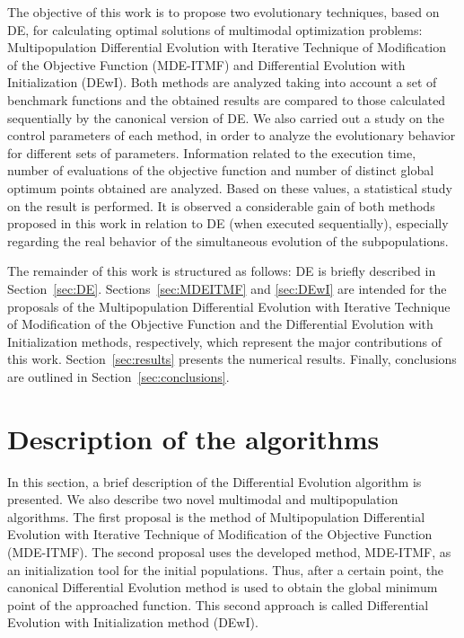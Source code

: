 \documentclass[smallextended]{svjour3}       %
\begin{document}
The objective of this work is to propose two evolutionary techniques, based on DE, for calculating optimal solutions of multimodal optimization problems: Multipopulation Differential Evolution with Iterative Technique of Modification of the Objective Function (MDE-ITMF) and Differential Evolution with Initialization (DEwI). Both methods are analyzed taking into account a set of benchmark functions and the obtained results are compared to those calculated sequentially by the canonical version of DE. We also carried out a study on the control parameters of each method, in order to analyze the evolutionary behavior for different sets of parameters. Information related to the execution time, number of evaluations of the objective function and number of distinct global optimum points obtained are analyzed. Based on these values, a statistical study on the result is performed. It is observed a considerable gain of both methods proposed in this work in relation to DE (when executed sequentially), especially regarding the real behavior of the simultaneous evolution of the subpopulations.

The remainder of this work is structured as follows: DE is briefly described in Section~\ref{sec:DE}. Sections~\ref{sec:MDEITMF} and \ref{sec:DEwI} are intended for the proposals of the Multipopulation Differential Evolution with Iterative Technique of Modification of the Objective Function and the Differential Evolution with Initialization methods, respectively, which represent the major contributions of this work. Section~\ref{sec:results} presents the numerical results. Finally, conclusions are outlined in Section~\ref{sec:conclusions}.

\section{Description of the algorithms}
\label{sec:novel_multmod_method}

In this section, a brief description of the Differential Evolution algorithm is presented. We also describe two novel multimodal and multipopulation algorithms. The first proposal is the method of Multipopulation Differential Evolution with Iterative Technique of Modification of the Objective Function (MDE-ITMF). The second proposal uses the developed method, MDE-ITMF, as an initialization tool for the initial populations. Thus, after a certain point, the canonical Differential Evolution method is used to obtain the global minimum point of the approached function. This second approach is called Differential Evolution with Initialization method (DEwI).
\end{document}
